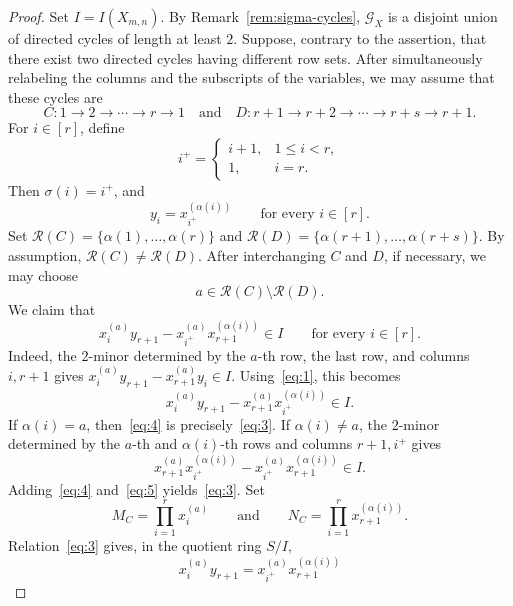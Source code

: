 \documentclass[12pt]{amsart}
\numberwithin{equation}{section}
\begin{document}
\begin{proof}
Set $I=I(X_{m,n})$. By Remark~\ref{rem:sigma-cycles},
$\mathcal G_X$ is a disjoint union of directed cycles of length
at least $2$. Suppose, contrary to the assertion, that there exist
two directed cycles having different row sets. After simultaneously
relabeling the columns and the subscripts of the variables, we may
assume that these cycles are
\[
C:
1\longrightarrow 2\longrightarrow\cdots\longrightarrow r
\longrightarrow 1
\quad \text{and}\quad
D:
r+1\longrightarrow r+2\longrightarrow\cdots
\longrightarrow r+s\longrightarrow r+1.
\]
For $i\in[r]$, define
\[
i^+=
\begin{cases}
i+1,&1\leq i<r,\\
1,&i=r.
\end{cases}
\]
Then $\sigma(i)=i^+$, and
\begin{equation}\label{eq:1}
y_i=x_{i^+}^{(\alpha(i))}
\qquad\text{for every }i\in[r].
\end{equation}
Set $\mathcal R(C)=\{\alpha(1),\ldots,\alpha(r)\}$ and
$\mathcal R(D)=\{\alpha(r+1),\ldots,\alpha(r+s)\}$.
By assumption, $\mathcal R(C)\neq\mathcal R(D)$.
After interchanging $C$ and $D$, if necessary, we may choose
\begin{equation}\label{eq:2}
a\in\mathcal R(C)\setminus\mathcal R(D).
\end{equation}
We claim that
\begin{equation}\label{eq:3}
x_i^{(a)}y_{r+1}
-
x_{i^+}^{(a)}x_{r+1}^{(\alpha(i))}
\in I
\qquad\text{for every }i\in[r].
\end{equation}
Indeed, the $2$-minor determined by the $a$-th row, the last row,
and columns $i,r+1$ gives
$x_i^{(a)}y_{r+1}-x_{r+1}^{(a)}y_i\in I$.
Using~\eqref{eq:1}, this becomes
\begin{equation}\label{eq:4}
x_i^{(a)}y_{r+1}
-
x_{r+1}^{(a)}x_{i^+}^{(\alpha(i))}
\in I.
\end{equation}
If $\alpha(i)=a$, then~\eqref{eq:4} is precisely~\eqref{eq:3}.
If $\alpha(i)\neq a$, the $2$-minor determined by the $a$-th and
$\alpha(i)$-th rows and columns $r+1,i^+$ gives
\begin{equation}\label{eq:5}
x_{r+1}^{(a)}x_{i^+}^{(\alpha(i))}
-
x_{i^+}^{(a)}x_{r+1}^{(\alpha(i))}
\in I.
\end{equation}
Adding~\eqref{eq:4} and~\eqref{eq:5} yields~\eqref{eq:3}. Set
\[
M_C=\prod_{i=1}^r x_i^{(a)}
\qquad\text{and}\qquad
N_C=\prod_{i=1}^r x_{r+1}^{(\alpha(i))}.
\]
Relation~\eqref{eq:3} gives, in the quotient ring $S/I$,
\[
x_i^{(a)}y_{r+1}
=
x_{i^+}^{(a)}x_{r+1}^{(\alpha(i))}
\]
\end{proof}
\end{document}

